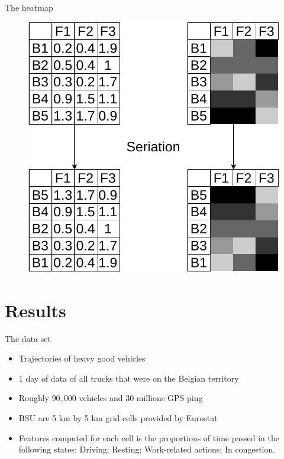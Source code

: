 \documentclass[10pt]{beamer}
\begin{document}
\begin{frame}{The heatmap}
    \begin{figure}
        \centering
        \includegraphics[scale=0.7]{figures/heatmaps.pdf}
    \end{figure}
\end{frame}

\section{Results}

\begin{frame}{The data set}
    \begin{itemize}
        \item Trajectories of heavy good vehicles
        \item 1 day of data of all trucks that were on the Belgian territory
        \item Roughly $90,000$ vehicles and $30$ millions GPS ping
        \item BSU are 5 km by 5 km grid cells provided by Eurostat
        \item Features computed for each cell is the proportions of time passed in the following states: Driving; Resting; Work-related actions; In congestion.
    \end{itemize}
\end{frame}
\end{document}
